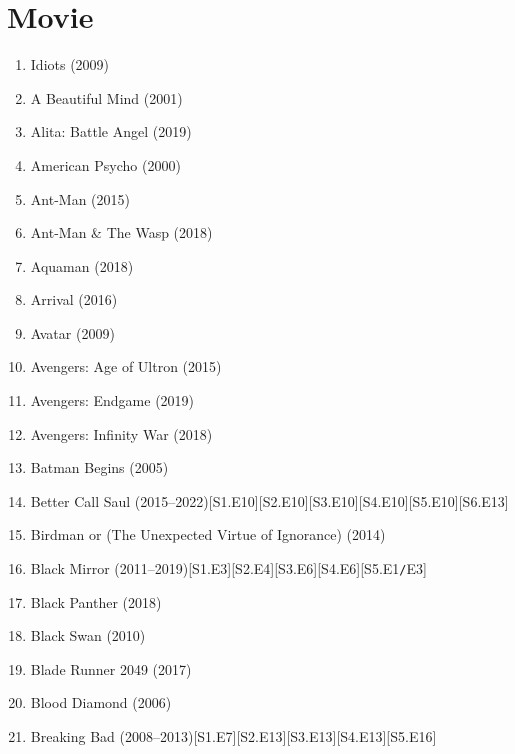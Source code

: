 \documentclass{article}
\begin{document}

\section{Movie}

\begin{enumerate}
	\item { Idiots} (2009)
	\item {\sc A Beautiful Mind} (2001)
	\item {\sc Alita: Battle Angel} (2019)
	\item {\sc American Psycho} (2000)
	\item {\sc Ant-Man} (2015)
	\item {\sc Ant-Man \& The Wasp} (2018)
	\item {\sc Aquaman} (2018)
	\item {\sc Arrival} (2016)
	\item {\sc Avatar} (2009)
	\item {\sc Avengers: Age of Ultron} (2015)
	\item {\sc Avengers: Endgame} (2019)
	\item {\sc Avengers: Infinity War} (2018)
	\item {\sc Batman Begins} (2005)
	\item {\sc Better Call Saul} (2015--2022)\hfill[S1.E10][S2.E10][S3.E10][S4.E10][S5.E10][S6.E13]
	\item {\sc Birdman or (The Unexpected Virtue of Ignorance)} (2014)
	\item Black Mirror (2011--2019)\hfill[S1.E3][S2.E4][S3.E6][S4.E6][S5.E1{\tt/}E3]
	\item {\sc Black Panther} (2018)
	\item {\sc Black Swan} (2010)
	\item {\sc Blade Runner 2049} (2017)
	\item {\sc Blood Diamond} (2006)
	\item {\sc Breaking Bad} (2008--2013)\hfill[S1.E7][S2.E13][S3.E13][S4.E13][S5.E16]


\end{enumerate}
\end{document}
